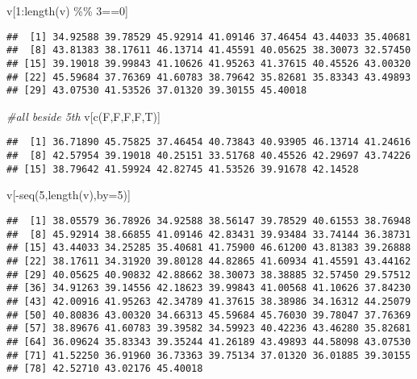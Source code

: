 \documentclass[]{article}
\newenvironment{Shaded}{\begin{snugshade}}{\end{snugshade}}
\newcommand{\AttributeTok}[1]{\textcolor[rgb]{0.77,0.63,0.00}{#1}}
\newcommand{\CommentTok}[1]{\textcolor[rgb]{0.56,0.35,0.01}{\textit{#1}}}
\newcommand{\DecValTok}[1]{\textcolor[rgb]{0.00,0.00,0.81}{#1}}
\newcommand{\FunctionTok}[1]{\textcolor[rgb]{0.00,0.00,0.00}{#1}}
\newcommand{\NormalTok}[1]{#1}
\newcommand{\SpecialCharTok}[1]{\textcolor[rgb]{0.00,0.00,0.00}{#1}}
\begin{document}
\begin{Shaded}
\begin{Highlighting}[]
\NormalTok{v[}\DecValTok{1}\SpecialCharTok{:}\FunctionTok{length}\NormalTok{(v) }\SpecialCharTok{\%\%} \DecValTok{3}\SpecialCharTok{==}\DecValTok{0}\NormalTok{]}
\end{Highlighting}
\end{Shaded}

\begin{verbatim}
##  [1] 34.92588 39.78529 45.92914 41.09146 37.46454 43.44033 35.40681
##  [8] 43.81383 38.17611 46.13714 41.45591 40.05625 38.30073 32.57450
## [15] 39.19018 39.99843 41.10626 41.95263 41.37615 40.45526 43.00320
## [22] 45.59684 37.76369 41.60783 38.79642 35.82681 35.83343 43.49893
## [29] 43.07530 41.53526 37.01320 39.30155 45.40018
\end{verbatim}

\begin{Shaded}
\begin{Highlighting}[]
\CommentTok{\#all beside 5th}
\NormalTok{v[}\FunctionTok{c}\NormalTok{(F,F,F,F,T)]}
\end{Highlighting}
\end{Shaded}

\begin{verbatim}
##  [1] 36.71890 45.75825 37.46454 40.73843 40.93905 46.13714 41.24616
##  [8] 42.57954 39.19018 40.25151 33.51768 40.45526 42.29697 43.74226
## [15] 38.79642 41.59924 42.82745 41.53526 39.91678 42.14528
\end{verbatim}

\begin{Shaded}
\begin{Highlighting}[]
\NormalTok{v[}\SpecialCharTok{{-}}\FunctionTok{seq}\NormalTok{(}\DecValTok{5}\NormalTok{,}\FunctionTok{length}\NormalTok{(v),}\AttributeTok{by=}\DecValTok{5}\NormalTok{)]}
\end{Highlighting}
\end{Shaded}

\begin{verbatim}
##  [1] 38.05579 36.78926 34.92588 38.56147 39.78529 40.61553 38.76948
##  [8] 45.92914 38.66855 41.09146 42.83431 39.93484 33.74144 36.38731
## [15] 43.44033 34.25285 35.40681 41.75900 46.61200 43.81383 39.26888
## [22] 38.17611 34.31920 39.80128 44.82865 41.60934 41.45591 43.44162
## [29] 40.05625 40.90832 42.88662 38.30073 38.38885 32.57450 29.57512
## [36] 34.91263 39.14556 42.18623 39.99843 41.00568 41.10626 37.84230
## [43] 42.00916 41.95263 42.34789 41.37615 38.38986 34.16312 44.25079
## [50] 40.80836 43.00320 34.66313 45.59684 45.76030 39.78047 37.76369
## [57] 38.89676 41.60783 39.39582 34.59923 40.42236 43.46280 35.82681
## [64] 36.09624 35.83343 39.35244 41.26189 43.49893 44.58098 43.07530
## [71] 41.52250 36.91960 36.73363 39.75134 37.01320 36.01885 39.30155
## [78] 42.52710 43.02176 45.40018
\end{verbatim}
\end{document}
